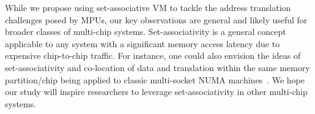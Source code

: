 While we propose using set-associative VM to tackle the address translation challenges posed by MPUs, our key observations are general and likely useful for broader classes of multi-chip systems. Set-associativity is a general concept applicable to any system with  a significant memory access latency due to expensive chip-to-chip traffic. For instance, one could also envision the ideas of set-associativity and co-location of data and translation within the same memory partition/chip being applied to classic multi-socket NUMA machines~\cite{hp:hp, huawei:kunlun, ning:open}. We hope our study will inspire researchers to leverage set-associativity in other multi-chip systems.


